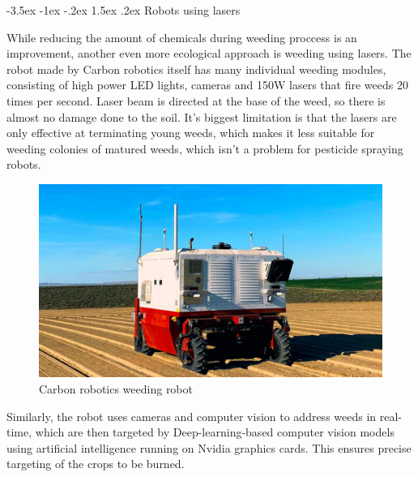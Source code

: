 \documentclass[a4paper,10pt]{article}
\makeatletter
\theoremstyle{definition}
\renewcommand\subsection{\@startsection {subsection}{1}{\z@}%
                                   {-3.5ex \@plus -1ex \@minus -.2ex}%
                                   {1.5ex \@plus.2ex}%
                                   {\normalsize\bfseries}}
\makeatother
\begin{document}
\subsection{Robots using lasers}
\label{subsec:2}

While reducing the amount of chemicals during weeding proccess is an improvement, another even more ecological approach is weeding using lasers. The robot made by Carbon robotics itself has many individual weeding modules, consisting of high power LED lights, cameras and 150W lasers that fire weeds 20 times per second. Laser beam is directed at the base of the weed, so there is almost no damage done to the soil. It's biggest limitation is that the lasers are only effective at terminating young weeds, which makes it less suitable for weeding colonies of matured weeds, which isn't a problem for pesticide spraying robots. 

\smallskip

\begin{figure}[h]
\begin{center}
\includegraphics[scale=0.4]{image/carbon_robot.jpg}
\caption{Carbon robotics weeding robot\cite{Swvcwnh6tdQ4SRdV}}
\end{center}
\end{figure}

\smallskip
Similarly, the robot uses cameras and computer vision to address weeds in real-time, which are then targeted by Deep-learning-based computer vision models using artificial intelligence running on Nvidia graphics cards. This ensures precise targeting of the crops to be burned.
\end{document}
